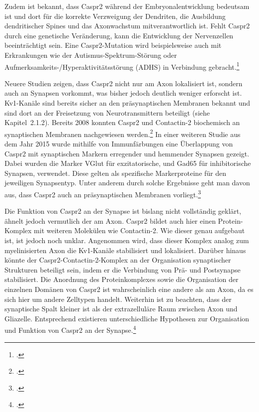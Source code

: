 Zudem ist bekannt, dass Caspr2 während der Embryonalentwicklung
bedeutsam ist und dort für die korrekte Verzweigung der Dendriten, die
Ausbildung dendritischer Spines und das Axonwachstum mitverantwortlich
ist. Fehlt Caspr2 durch eine genetische Veränderung, kann die
Entwicklung der Nervenzellen beeinträchtigt sein. Eine Caspr2-Mutation
wird beispielsweise auch mit Erkrankungen wie der
Autismus-Spektrum-Störung oder Aufmerksamkeits-/Hyperaktivitätsstörung
(ADHS) in Verbindung
gebracht.\footcite{Canali2018}

Neuere Studien zeigen, dass Caspr2 nicht nur am Axon lokalisiert ist,
sondern auch an Synapsen vorkommt, was bisher jedoch deutlich weniger
erforscht ist. Kv1-Kanäle sind bereits sicher an den präsynaptischen
Membranen bekannt und sind dort an der Freisetzung von
Neurotransmittern beteiligt (siehe Kapitel~2.1.2). Bereits 2008 konnten
Caspr2 und Contactin-2 biochemisch an synaptischen Membranen
nachgewiesen werden.\footcite{Bakkaloglu2008}
In einer weiteren Studie aus dem Jahr 2015 wurde mithilfe von
Immunfärbungen eine Überlappung von Caspr2 mit synaptischen Markern
erregender und hemmender Synapsen gezeigt. Dabei wurden die Marker
VGlut für exzitatorische, und Gad65 für inhibitorische Synapsen,
verwendet. Diese gelten als spezifische Markerproteine für den
jeweiligen Synapsentyp. Unter anderem durch solche Ergebnisse geht man
davon aus, dass Caspr2 auch an präsynaptischen Membranen
vorliegt.\footcite{Pinatel2015}

Die Funktion von Caspr2 an der Synapse ist bislang nicht vollständig
geklärt, ähnelt jedoch vermutlich der am Axon. Caspr2 bildet auch hier
einen Protein-Komplex mit weiteren Molekülen wie Contactin-2. Wie
dieser genau aufgebaut ist, ist jedoch noch unklar. Angenommen wird,
dass dieser Komplex analog zum myelinisierten Axon die Kv1-Kanäle
stabilisiert und lokalisiert. Darüber hinaus könnte der
Caspr2-Contactin-2-Komplex an der Organisation synaptischer Strukturen
beteiligt sein, indem er die Verbindung von Prä- und Postsynapse
stabilisiert. Die Anordnung des Proteinkomplexes sowie die Organisation
der einzelnen Domänen von Caspr2 ist wahrscheinlich eine andere als am
Axon, da es sich hier um andere Zelltypen handelt. Weiterhin ist zu
beachten, dass der synaptische Spalt kleiner ist als der extrazelluläre
Raum zwischen Axon und Gliazelle. Entsprechend existieren
unterschiedliche Hypothesen zur Organisation und Funktion von Caspr2 an
der Synapse.\footcite{Canali2018}

